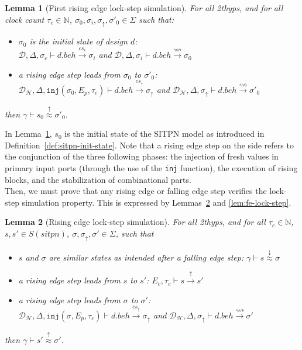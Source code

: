 \documentclass[pdflatex,sn-mathphys]{sn-jnl}%
\theoremstyle{thmstyleone}%
\theoremstyle{thmstyletwo}%
\theoremstyle{thmstylethree}%
\newtheorem{lemma}{Lemma}%
\begin{document}
\begin{lemma}[First rising edge lock-step simulation]
  \label{lem:fst-re-lock-step}
  For all \hm2thyps{}, and for all clock count $\tau_c\in\mathbb{N}$,
  $\sigma_0,\sigma_i,\sigma_{\uparrow},\sigma'_0\in{}\Sigma$ such that:
  \begin{itemize}
  \item $\sigma_0$ is the initial state of design $d$:\\
    $\mathcal{D},\Delta,\sigma_e\vdash{}d.beh\xrightarrow{cs_i}{}\sigma_i$ and
    $\mathcal{D},\Delta,\sigma_i\vdash{}d.beh\xrightarrow{\rightsquigarrow}{}\sigma_0$
    
  \item a rising edge step leads from $\sigma_0$ to $\sigma'_0$:\\
    $\mathcal{D}_\mathcal{H},\Delta,\mathtt{inj}(\sigma_0,E_p,\tau_c)\vdash{}d.beh\xrightarrow{cs_{\uparrow}}\sigma_{\uparrow}$
    and
    $\mathcal{D}_\mathcal{H},\Delta,\sigma_{\uparrow}\vdash{}d.beh\xrightarrow{\rightsquigarrow}\sigma'_0$
  \end{itemize}
  then $\gamma\vdash{}s_0\stackrel{\uparrow}{\approx}\sigma'_0$.
\end{lemma}
In Lemma~\ref{lem:fst-re-lock-step}, $s_0$ is the initial state of the
SITPN model as introduced in
Definition~\ref{def:sitpn-init-state}.  Note that a rising edge step on the \hvhdl{} side refers to the conjunction of the three following phases: the injection of fresh values in primary input ports (through the use of the \texttt{inj} function), the execution of rising blocks, and the stabilization of combinational parts. \\

Then, we must prove that any rising edge or falling edge step verifies
the lock-step simulation property. This is expressed by
Lemmas~\ref{lem:re-lock-step} and \ref{lem:fe-lock-step}. 

\begin{lemma}[Rising edge lock-step simulation]
  \label{lem:re-lock-step}
  For all \hm2thyps{}, and for all $\tau_c\in\mathbb{N}$,
  $s,s'\in{}S(sitpn)$, $\sigma,\sigma_\uparrow,\sigma'\in\Sigma$, such
  that
  \begin{itemize}
  \item $s$ and $\sigma$ are similar states as intended after a
    falling edge step:
    $\gamma\vdash{}s\stackrel{\downarrow}{\approx}\sigma$
  \item a rising edge step leads from $s$ to $s'$:
    $E_c,\tau_c\vdash{}s\xrightarrow{\uparrow}s'$
  \item a rising edge step leads from $\sigma$ to $\sigma'$:\\
    $\mathcal{D}_\mathcal{H},\Delta,\mathtt{inj}(\sigma,E_p,\tau_c)\vdash{}d.beh\xrightarrow{cs_{\uparrow}}\sigma_{\uparrow}$
    and
    $\mathcal{D}_\mathcal{H},\Delta,\sigma_{\uparrow}\vdash{}d.beh\xrightarrow{\rightsquigarrow}\sigma'$
  \end{itemize}
  then $\gamma\vdash{}s'\stackrel{\uparrow}{\approx}{}\sigma'$.
  
\end{lemma}
\end{document}
